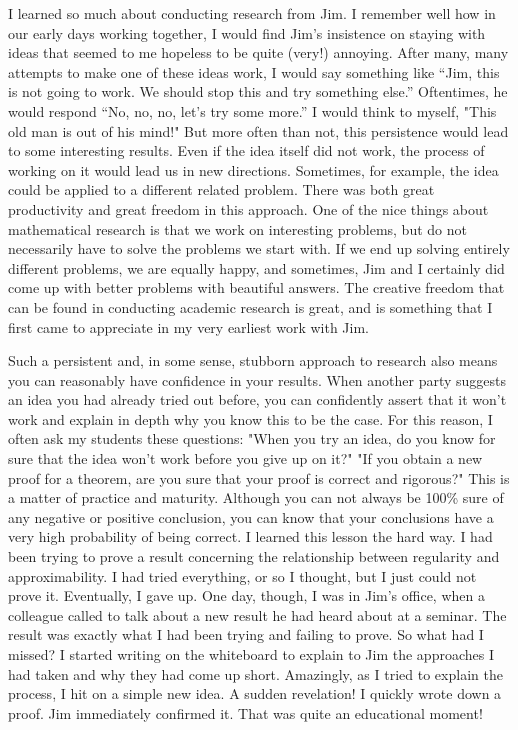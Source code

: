 \documentclass[CJK,11pt]{amsart}
\theoremstyle{definition}
\begin{document}
\begin{CJK*}{UTF8}{gbsn}
I learned so much about conducting research from Jim. I remember well how in our early days working together, I would find Jim's insistence on staying with ideas that seemed to me hopeless to be quite (very!) annoying. After many, many attempts to make one of these ideas work, I would say something like ``Jim, this is not going to work. We should stop this and try something else.'' Oftentimes, he would respond ``No, no, no, let's try some more.'' I would think to myself, "This old man is out of his mind!" But more often than not, this persistence would lead to some interesting results. Even if the idea itself did not work, the process of working on it would lead us in new directions. Sometimes, for example, the idea could be applied to a different related problem.
There was both great productivity and great freedom in this approach. One of the nice things about mathematical research is that we work on interesting problems, but do not necessarily have to solve the problems we start with. If we end up solving entirely different problems, we are equally happy, and sometimes, Jim and I certainly did come up with better problems with beautiful answers. The creative freedom that can be found in conducting academic research is great, and is something that I first came to appreciate in my very earliest work with Jim.

Such a persistent and, in some sense, stubborn approach to research also means you can reasonably have confidence in your results. When another party suggests an idea you had already tried out before, you can confidently assert that it won't work and explain in depth why you know this to be the case. For this reason, I often ask my students these questions: "When you try an idea, do you know for sure that the idea won't work before you give up on it?" "If you obtain a new proof for a theorem, are you sure that your proof is correct and rigorous?" This is a matter of practice and maturity. Although you can not always be 100\% sure of any negative or positive conclusion, you can know that your conclusions have a very high probability of being correct. 
I learned this lesson the hard way. I had been trying to prove a result concerning the relationship between regularity and approximability. I had tried everything, or so I thought, but I just could not prove it. Eventually, I gave up. One day, though, I was in Jim's office, when a colleague called to talk about a new result he had heard about at a seminar. The result was exactly what I had been trying and failing to prove. So what had I missed? I started writing on the whiteboard to explain to Jim the approaches I had taken and why they had come up short. Amazingly, as I tried to explain the process, I hit on a simple new idea. A sudden revelation! I quickly wrote down a proof. Jim immediately confirmed it. That was quite an educational moment!


\end{CJK*}
\end{document}
